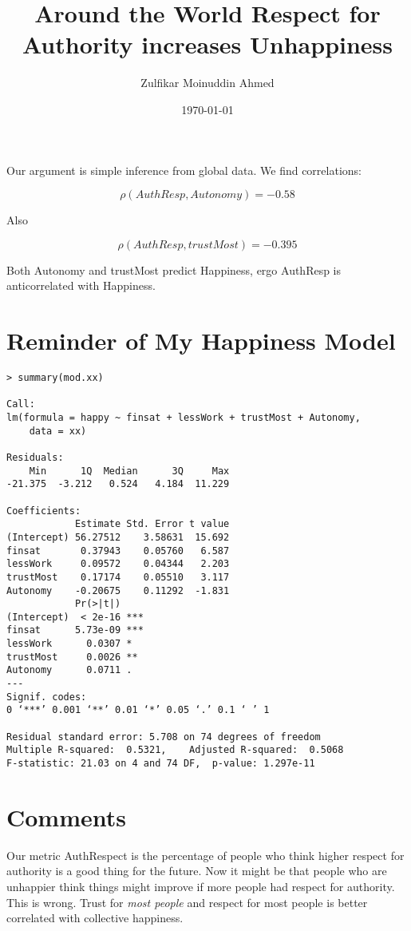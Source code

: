 \documentclass{amsart}
\title{Around the World Respect for Authority increases Unhappiness}
\author{Zulfikar Moinuddin Ahmed}
\date{\today}
\begin{document}
\maketitle

Our argument is simple inference from global data.  We find correlations:

\[
\rho( AuthResp, Autonomy ) = -0.58
\]

Also

\[
\rho( AuthResp, trustMost ) = -0.395
\]

Both Autonomy and trustMost predict Happiness, ergo AuthResp is anticorrelated with Happiness.

\section{Reminder of My Happiness Model}

\begin{verbatim}
> summary(mod.xx)

Call:
lm(formula = happy ~ finsat + lessWork + trustMost + Autonomy, 
    data = xx)

Residuals:
    Min      1Q  Median      3Q     Max 
-21.375  -3.212   0.524   4.184  11.229 

Coefficients:
            Estimate Std. Error t value
(Intercept) 56.27512    3.58631  15.692
finsat       0.37943    0.05760   6.587
lessWork     0.09572    0.04344   2.203
trustMost    0.17174    0.05510   3.117
Autonomy    -0.20675    0.11292  -1.831
            Pr(>|t|)    
(Intercept)  < 2e-16 ***
finsat      5.73e-09 ***
lessWork      0.0307 *  
trustMost     0.0026 ** 
Autonomy      0.0711 .  
---
Signif. codes:  
0 ‘***’ 0.001 ‘**’ 0.01 ‘*’ 0.05 ‘.’ 0.1 ‘ ’ 1

Residual standard error: 5.708 on 74 degrees of freedom
Multiple R-squared:  0.5321,	Adjusted R-squared:  0.5068 
F-statistic: 21.03 on 4 and 74 DF,  p-value: 1.297e-11
\end{verbatim}

\section{Comments}
Our metric AuthRespect is the percentage of people who think higher respect for authority is a good thing for the future.  Now it might be that people who are unhappier think things might improve if more people had respect for authority.  This is wrong.  Trust for {\em most people} and respect for most people is better correlated with collective happiness.  
\end{document}
